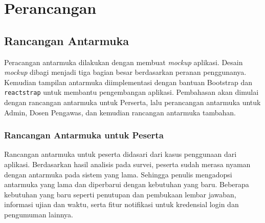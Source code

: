\chapter{Perancangan}
\label{chap:perancangan}

\section{Rancangan Antarmuka}
    Peracangan antarmuka dilakukan dengan membuat \textit{mockup} aplikasi. Desain \textit{mockup} dibagi 
    menjadi tiga bagian besar berdasarkan peranan penggunanya.
    Kemudian tampilan antarmuka diimplementasi dengan bantuan Bootstrap dan \texttt{reactstrap} untuk
    membantu pengembangan aplikasi. Pembahasan akan dimulai dengan rancangan 
    antarmuka untuk Perserta, lalu perancangan antarmuka untuk Admin, Dosen Pengawas, dan kemudian rancangan 
    antarmuka tambahan.

\subsection{Rancangan Antarmuka untuk Peserta}
    Rancangan antarmuka untuk peserta didasari dari kasus penggunaan dari aplikasi. Berdasarkan hasil analisis
    pada survei, peserta sudah merasa nyaman dengan antarmuka pada sistem yang lama. Sehingga penulis
    mengadopsi antarmuka yang lama dan diperbarui dengan kebutuhan yang baru. Beberapa kebutuhan yang baru
    seperti penutupan dan pembukaan lembar jawaban, informasi ujian dan waktu, serta fitur notifikasi untuk
    kredensial login dan pengumuman lainnya.
    
